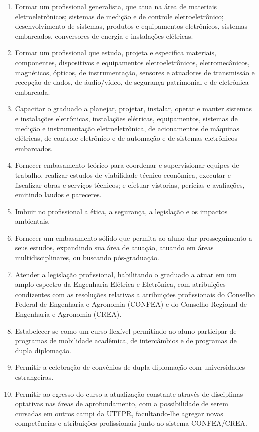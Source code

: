 \begin{enumerate}
	\item	Formar um profissional generalista, que atua na área de materiais eletroeletrônicos; sistemas de medição e de controle eletroeletrônico; desenvolvimento de sistemas, produtos e equipamentos eletrônicos, sistemas embarcados, conversores de energia e instalações elétricas.
	\item	Formar um profissional que estuda, projeta e especifica materiais, componentes, dispositivos e equipamentos eletroeletrônicos, eletromecânicos, magnéticos, ópticos, de instrumentação, sensores e atuadores de transmissão e recepção de dados, de áudio/vídeo, de segurança patrimonial e de eletrônica embarcada.
	\item	Capacitar o graduado a planejar, projetar, instalar, operar e manter sistemas e instalações eletrônicas, instalações elétricas, equipamentos, sistemas de medição e instrumentação eletroeletrônica, de acionamentos de máquinas elétricas, de controle eletrônico e de automação e de sistemas eletrônicos embarcados.
	\item	Fornecer embasamento teórico para coordenar e supervisionar equipes de trabalho, realizar estudos de viabilidade técnico-econômica, executar e fiscalizar obras e serviços técnicos; e efetuar vistorias, perícias e avaliações, emitindo laudos e pareceres.
	\item	Imbuir no profissional a ética, a segurança, a legislação e os impactos ambientais.
	\item	Fornecer um embasamento sólido que permita ao aluno dar prosseguimento a seus estudos, expandindo sua área de atuação, atuando em áreas multidisciplinares, ou buscando pós-graduação.
	\item	Atender a legislação profissional, habilitando o graduado a atuar em um amplo espectro da Engenharia Elétrica e Eletrônica, com atribuições condizentes com as resoluções relativas a atribuições profissionais do Conselho Federal de Engenharia e Agronomia (CONFEA) e do Conselho Regional de Engenharia e Agronomia (CREA).
	\item	Estabelecer-se como um curso flexível permitindo ao aluno participar de programas de mobilidade acadêmica, de intercâmbios e de programas de dupla diplomação.
	\item	Permitir a celebração de convênios de dupla diplomação com universidades estrangeiras.
	\item	Permitir ao egresso do curso a atualização constante através de disciplinas optativas nas áreas de aprofundamento, com a possibilidade de serem cursadas em outros campi da UTFPR, facultando-lhe agregar novas competências e atribuições profissionais junto ao sistema CONFEA/CREA.
\end{enumerate}

